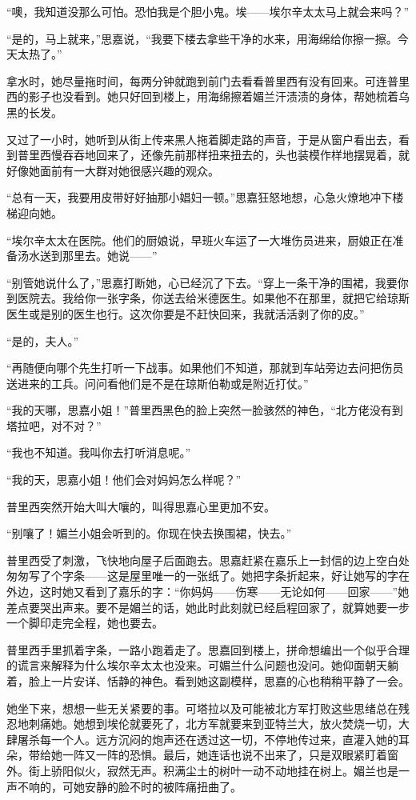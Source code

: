 \par “噢，我知道没那么可怕。恐怕我是个胆小鬼。埃——埃尔辛太太马上就会来吗？”
\par “是的，马上就来，”思嘉说，“我要下楼去拿些干净的水来，用海绵给你擦一擦。今天太热了。”
\par 拿水时，她尽量拖时间，每两分钟就跑到前门去看看普里西有没有回来。可连普里西的影子也没看到。她只好回到楼上，用海绵擦着媚兰汗渍渍的身体，帮她梳着乌黑的长发。
\par 又过了一小时，她听到从街上传来黑人拖着脚走路的声音，于是从窗户看出去，看到普里西慢吞吞地回来了，还像先前那样扭来扭去的，头也装模作样地摆晃着，就好像她面前有一大群对她很感兴趣的观众。
\par “总有一天，我要用皮带好好抽那小娼妇一顿。”思嘉狂怒地想，心急火燎地冲下楼梯迎向她。
\par “埃尔辛太太在医院。他们的厨娘说，早班火车运了一大堆伤员进来，厨娘正在准备汤水送到那里去。她说——”
\par “别管她说什么了，”思嘉打断她，心已经沉了下去。“穿上一条干净的围裙，我要你到医院去。我给你一张字条，你送去给米德医生。如果他不在那里，就把它给琼斯医生或是别的医生也行。这次你要是不赶快回来，我就活活剥了你的皮。”
\par “是的，夫人。”
\par “再随便向哪个先生打听一下战事。如果他们不知道，那就到车站旁边去问把伤员送进来的工兵。问问看他们是不是在琼斯伯勒或是附近打仗。”
\par “我的天哪，思嘉小姐！”普里西黑色的脸上突然一脸骇然的神色，“北方佬没有到塔拉吧，对不对？”
\par “我也不知道。我叫你去打听消息呢。”
\par “我的天，思嘉小姐！他们会对妈妈怎么样呢？”
\par 普里西突然开始大叫大嚷的，叫得思嘉心里更加不安。
\par “别嚷了！媚兰小姐会听到的。你现在快去换围裙，快去。”
\par 普里西受了刺激，飞快地向屋子后面跑去。思嘉赶紧在嘉乐上一封信的边上空白处匆匆写了个字条——这是屋里唯一的一张纸了。她把字条折起来，好让她写的字在外边，这时她又看到了嘉乐的字：“你妈妈——伤寒——无论如何——回家——”她差点要哭出声来。要不是媚兰的话，她此时此刻就已经启程回家了，就算她要一步一个脚印走完全程，她也要去。
\par 普里西手里抓着字条，一路小跑着走了。思嘉回到楼上，拼命想编出一个似乎合理的谎言来解释为什么埃尔辛太太也没来。可媚兰什么问题也没问。她仰面朝天躺着，脸上一片安详、恬静的神色。看到她这副模样，思嘉的心也稍稍平静了一会。
\par 她坐下来，想想一些无关紧要的事。可塔拉以及可能被北方军打败这些思绪总在残忍地刺痛她。她想到埃伦就要死了，北方军就要来到亚特兰大，放火焚烧一切，大肆屠杀每一个人。远方沉闷的炮声还在透过这一切，不停地传过来，直灌入她的耳朵，带给她一阵又一阵的恐惧。最后，她连话也说不出来了，只是双眼紧盯着窗外。街上骄阳似火，寂然无声。积满尘土的树叶一动不动地挂在树上。媚兰也是一声不响的，可她安静的脸不时的被阵痛扭曲了。
